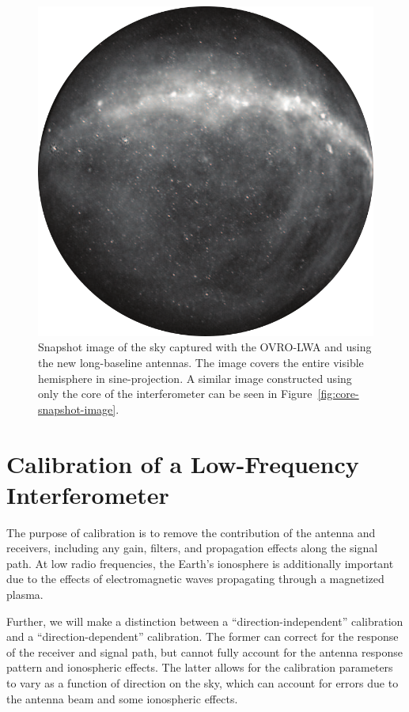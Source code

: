 \begin{bibunit}
\begin{figure}[p]
    \centering
    \includegraphics[width=\textwidth]{figures/chapter2/after-expansion}
    \caption{
        Snapshot image of the sky captured with the OVRO-LWA and using the new long-baseline
        antennas. The image covers the entire visible hemisphere in sine-projection.  A similar
        image constructed using only the core of the interferometer can be seen in
        Figure~\ref{fig:core-snapshot-image}.
    }
    \label{fig:expansion-snapshot-image}
\end{figure}

\section{Calibration of a Low-Frequency Interferometer}

The purpose of calibration is to remove the contribution of the antenna and receivers, including any
gain, filters, and propagation effects along the signal path. At low radio frequencies, the Earth's
ionosphere is additionally important due to the effects of electromagnetic waves propagating through
a magnetized plasma.

Further, we will make a distinction between a ``direction-independent'' calibration and a
``direction-dependent'' calibration. The former can correct for the response of the receiver and
signal path, but cannot fully account for the antenna response pattern and ionospheric effects. The
latter allows for the calibration parameters to vary as a function of direction on the sky, which
can account for errors due to the antenna beam and some ionospheric effects.


\end{bibunit}
